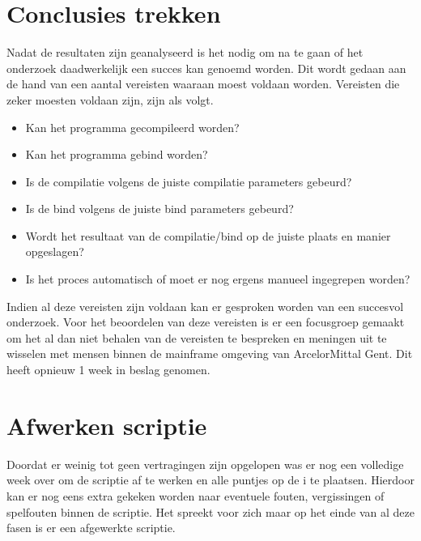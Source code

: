 \section{Conclusies trekken}
\label{sec:conclusies}
Nadat de resultaten zijn geanalyseerd is het nodig om na te gaan of het onderzoek daadwerkelijk een succes kan genoemd worden. Dit wordt gedaan aan de hand van een aantal vereisten waaraan moest voldaan worden. Vereisten die zeker moesten voldaan zijn, zijn als volgt. 
\begin{itemize}
    \item Kan het programma gecompileerd worden?
    \item Kan het programma gebind worden?
    \item Is de compilatie volgens de juiste compilatie parameters gebeurd?
    \item Is de bind volgens de juiste bind parameters gebeurd?
    \item Wordt het resultaat van de compilatie/bind op de juiste plaats en manier opgeslagen?
    \item Is het proces automatisch of moet er nog ergens manueel ingegrepen worden?
\end{itemize}
Indien al deze vereisten zijn voldaan kan er gesproken worden van een succesvol onderzoek.
Voor het beoordelen van deze vereisten is er een focusgroep gemaakt om het al dan niet behalen van de vereisten te bespreken en meningen uit te wisselen met mensen binnen de mainframe omgeving van ArcelorMittal Gent. Dit heeft opnieuw 1 week in beslag genomen.

\section{Afwerken scriptie}
\label{sec:afwerken scriptie}
Doordat er weinig tot geen vertragingen zijn opgelopen was er nog een volledige week over om de scriptie af te werken en alle puntjes op de i te plaatsen. Hierdoor kan er nog eens extra gekeken worden naar eventuele fouten, vergissingen of spelfouten binnen de scriptie. Het spreekt voor zich maar op het einde van al deze fasen is er een afgewerkte scriptie. 

